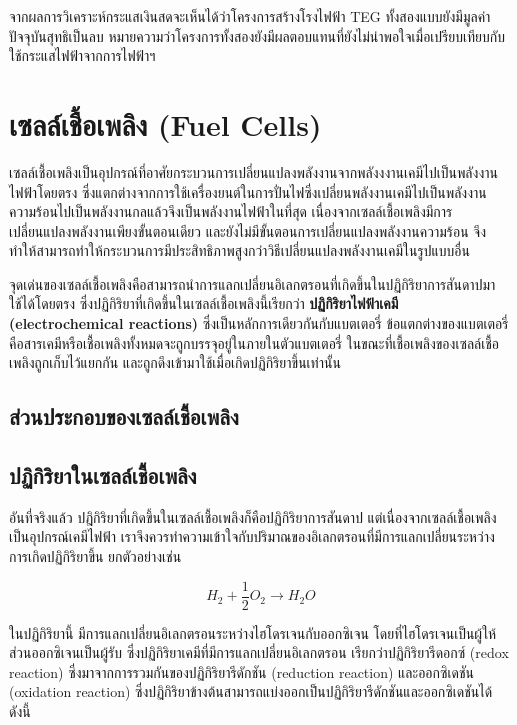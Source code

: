 \documentclass[11pt]{article}
\begin{document}
จากผลการวิเคราะห์กระแสเงินสดจะเห็นได้ว่าโครงการสร้างโรงไฟฟ้า TEG ทั้งสองแบบยังมีมูลค่าปัจจุบันสุทธิเป็นลบ หมายความว่าโครงการทั้งสองยังมีผลตอบแทนที่ยังไม่น่าพอใจเมื่อเปรียบเทียบกับใช้กระแสไฟฟ้าจากการไฟฟ้าฯ

\section{เซลล์เชื้อเพลิง (Fuel Cells)}
\label{sec:org51996ac}

เซลล์เชื้อเพลิงเป็นอุปกรณ์ที่อาศัยกระบวนการเปลี่ยนแปลงพลังงานจากพลังงงานเคมีไปเป็นพลังงานไฟฟ้าโดยตรง ซึ่งแตกต่างจากการใช้เครื่องยนต์ในการปั่นไฟซึ่งเปลี่ยนพลังงานเคมีไปเป็นพลังงานความร้อนไปเป็นพลังงานกลแล้วจึงเป็นพลังงานไฟฟ้าในที่สุด เนื่องจากเซลล์เชื้อเพลิงมีการเปลี่ยนแปลงพลังงานเพียงขั้นตอนเดียว และยังไม่มีขั้นตอนการเปลี่ยนแปลงพลังงานความร้อน จึงทำให้สามารถทำให้กระบวนการมีประสิทธิภาพสูงกว่าวิธีเปลี่ยนแปลงพลังงานเคมีในรูปแบบอื่น



จุดเด่นของเซลล์เชื้อเพลิงคือสามารถนำการแลกเปลี่ยนอิเลกตรอนที่เกิดขึ้นในปฏิกิริยาการสันดาปมาใช้ได้โดยตรง ซึ่งปฏิกิริยาที่เกิดขึ้นในเซลล์เชื้อเพลิงนี้เรียกว่า \textbf{ปฏิกิริยาไฟฟ้าเคมี (electrochemical reactions)} ซึ่งเป็นหลักการเดียวกันกับแบตเตอรี่ ข้อแตกต่างของแบตเตอรี่คือสารเคมีหรือเชื้อเพลิงทั้งหมดจะถูกบรรจุอยู่ในภายในตัวแบตเตอรี่ ในขณะที่เชื้อเพลิงของเซลล์เชื้อเพลิงถูกเก็บไว้แยกกัน และถูกดึงเข้ามาใช้เมื่อเกิดปฏิกิริยาขึ้นเท่านั้น

\subsection{ส่วนประกอบของเซลล์เชื้อเพลิง}
\label{sec:org982b3ba}

\subsection{ปฏิกิริยาในเซลล์เชื้อเพลิง}
\label{sec:orgf46d7fa}

อันที่จริงแล้ว ปฎิกิริยาที่เกิดขึ้นในเซลล์เชื้อเพลิงก็คือปฏิกิริยาการสันดาป แต่เนื่องจากเซลล์เชื้อเพลิงเป็นอุปกรณ์เคมีไฟฟ้า เราจึงควรทำความเข้าใจกับปริมาณของอิเลกตรอนที่มีการแลกเปลี่ยนระหว่างการเกิดปฏิกิริยาขึ้น ยกตัวอย่างเช่น

$$ H_2 + \frac{1}{2} O_2 \rightarrow H_2O $$

ในปฏิกิริยานี้ มีการแลกเปลี่ยนอิเลกตรอนระหว่างไฮโดรเจนกับออกซิเจน โดยที่ไฮโดรเจนเป็นผู้ให้ ส่วนออกซิเจนเป็นผู้รับ ซึ่งปฏิกิริยาเคมีที่มีการแลกเปลี่ยนอิเลกตรอน เรียกว่าปฏิกิริยารีดอกซ์ (redox reaction) ซึ่งมาจากการรวมกันของปฏิกิริยารีดักชัน (reduction reaction) และออกซิเดชัน (oxidation reaction) ซึ่งปฏิกิริยาข้างต้นสามารถแบ่งออกเป็นปฏิกิริยารีดักชันและออกซิเดชันได้ดังนี้
\end{document}
